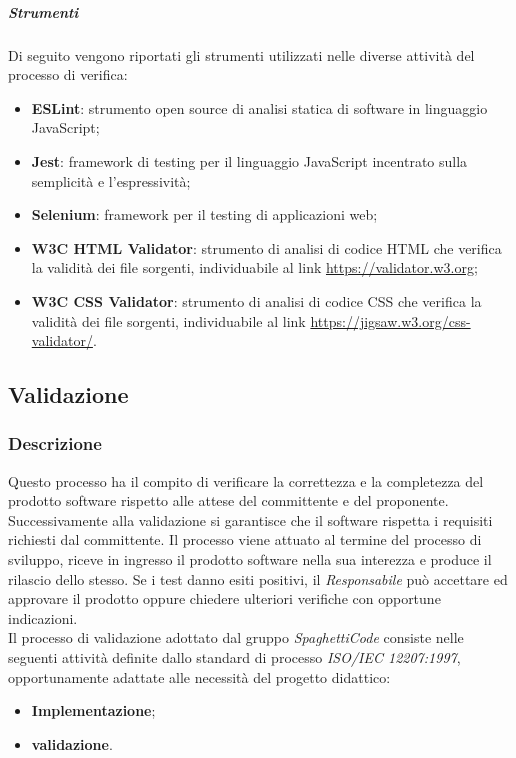 \subparagraph{Strumenti}
\label{ssub:verifica:strumenti}

Di seguito vengono riportati gli strumenti utilizzati nelle diverse attività del processo di verifica:
\begin{itemize}
	\item \textbf{ESLint}: strumento open source di analisi statica di software in linguaggio JavaScript;
	\item \textbf{Jest}: framework di testing per il linguaggio JavaScript incentrato sulla semplicità e l'espressività;
	\item \textbf{Selenium}: framework per il testing di applicazioni web;
	\item \textbf{W3C HTML Validator}: strumento di analisi di codice HTML che verifica la validità dei file sorgenti, individuabile al
		link \url{https://validator.w3.org};
	\item \textbf{W3C CSS Validator}: strumento di analisi di codice CSS che verifica la validità dei file sorgenti, individuabile al
		link \url{https://jigsaw.w3.org/css-validator/}.
\end{itemize}

\subsection{Validazione}
\label{sub:validazione}

\subsubsection{Descrizione}
Questo processo ha il compito di verificare la correttezza e la completezza del prodotto software rispetto alle attese del committente e
del proponente. Successivamente alla validazione si garantisce che il software rispetta i requisiti richiesti dal committente.
Il processo viene attuato al termine del processo di sviluppo, riceve in ingresso il prodotto software nella sua interezza
e produce il rilascio dello stesso. Se i test danno esiti positivi, il \emph{Responsabile} può accettare ed approvare il prodotto oppure chiedere ulteriori verifiche con opportune indicazioni.\\

Il processo di validazione adottato dal gruppo \emph{SpaghettiCode} consiste nelle seguenti attività definite dallo standard di processo \emph{ISO/IEC 12207:1997}, opportunamente adattate alle necessità del progetto didattico:
\begin{itemize}
	\item \textbf{Implementazione};
	\item \textbf{validazione}.
\end{itemize}

